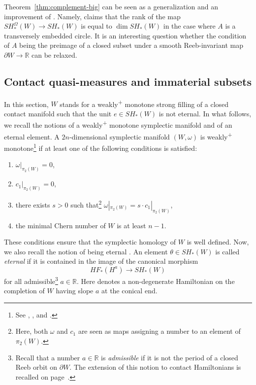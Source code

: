 \documentclass[pdftex]{sigma}
\numberwithin{equation}{section}
\theoremstyle{definition}
\begin{document}
Theorem~\ref{thm:complement-big} can be seen as a generalization and an improvement of \cite[Theorem~7.4]{uljarevic2023selective}. {Namely, \cite[Theorem~7.4]{uljarevic2023selective} claims that the rank of the map $SH^{\Omega}_\ast(W)\to SH_\ast(W)$ is equal to $\dim SH_\ast(W)$ in the case where $A$ is a transversely embedded circle. It is an interesting question whether the condition of $A$ being the preimage of a closed subset under a smooth Reeb-invariant map~${\partial W\to \mathbb{R}}$ can be relaxed.}

\subsection{Contact quasi-measures and immaterial subsets}

In this section, $W$ stands for a weakly\textsuperscript{+} monotone strong filling of a closed contact manifold such that the unit $e\in SH_\ast(W)$ is not eternal. {In what follows, we recall the notions of a weakly\textsuperscript{+} monotone symplectic manifold and of an eternal element. A} $2n$-dimensional symplectic manifold $(W, \omega)$ is weakly\textsuperscript{+} monotone\footnote{ See \cite[Lemma~1.1]{hofer1995floer}, \cite[Assumption ($W^+$)]{seidel1997pi_1}, and \cite[Section~2B]{ritter2016circle}.} if at least one of the following conditions is satisfied:
\begin{enumerate}\itemsep=0pt
\item[(1)] $ \omega |_{\pi_2(W)}=0$,
\item[(2)] $ c_1 |_{\pi_2(W)}=0$,
\item[(3)] there exists $s>0$ such that\footnote{Here, both $\omega$ and $c_1$ are seen as maps assigning a number to an element of $\pi_2(W)$.} $ \omega |_{\pi_2(W)}= s\cdot c_1 |_{\pi_2(W)}$,
\item[(4)] the minimal Chern number of $W$ is at least $n-1$.
\end{enumerate}
These conditions ensure that the symplectic homology of $W$ is well defined. Now, we also recall the notion of being eternal \cite{cant2024remarks}. An element $\theta\in SH_\ast(W)$ is called {\emph{eternal}} if it is contained in the image of the canonical morphism
\[ HF_\ast(H^a)\to SH_\ast(W) \]
for all admissible\footnote{{Recall that a number $a\in\mathbb{R}$ is \emph{admissible} if it is not the period of a closed Reeb orbit on $\partial W$. The extension of this notion to contact Hamiltonians is recalled on page~\pageref{def:admissible}}.} $a\in \mathbb{R}$. Here  denotes a non-degenerate Hamiltonian on the completion  of $W$ having slope $a$ at the conical end.
\end{document}
